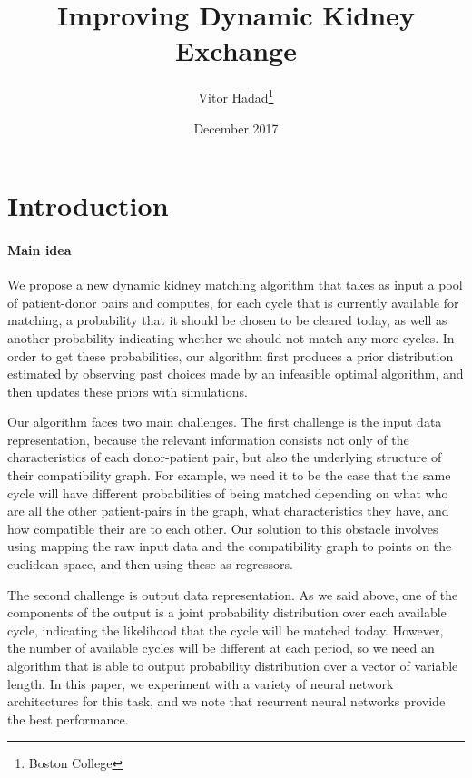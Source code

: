 \documentclass[12pt]{article}
\begin{document}
\begin{titlepage}
\title{Improving Dynamic Kidney Exchange}
\author{Vitor Hadad\thanks{Boston College}}
\date{December 2017}
\maketitle
\begin{abstract}

\bigskip
\end{abstract}
\setcounter{page}{0}
\thispagestyle{empty}
\end{titlepage}
\pagebreak 



\section{Introduction} \label{sec:introduction}


\paragraph{Main idea} We propose a new dynamic kidney matching algorithm that takes as input a pool of patient-donor pairs and computes, for each cycle that is currently available for matching, a probability that it should be chosen to be cleared today, as well as another probability indicating whether we should not match any more cycles. In order to get these probabilities, our algorithm first produces a prior distribution estimated by observing past choices made by an infeasible optimal algorithm, and then updates these priors with simulations. 

Our algorithm faces two main challenges. The first challenge is the input data representation, because the relevant information consists not only of the characteristics of each donor-patient pair, but also the underlying structure of their compatibility graph. For example, we need it to be the case that the same cycle will have different probabilities of being matched depending on what who are all the other patient-pairs in the graph, what characteristics they have, and how compatible their are to each other. Our solution to this obstacle involves using mapping the raw input data and the compatibility graph to points on the euclidean space, and then using these as regressors.

The second challenge is output data representation. As we said above, one of the components of the output is a joint probability distribution over each available cycle, indicating the likelihood that the cycle will be matched today. However, the number of available cycles will be different at each period, so we need an algorithm that is able to output probability distribution over a vector of variable length. In this paper, we experiment with a variety of neural network architectures for this task, and we note that recurrent neural networks provide the best performance.
\end{document}

